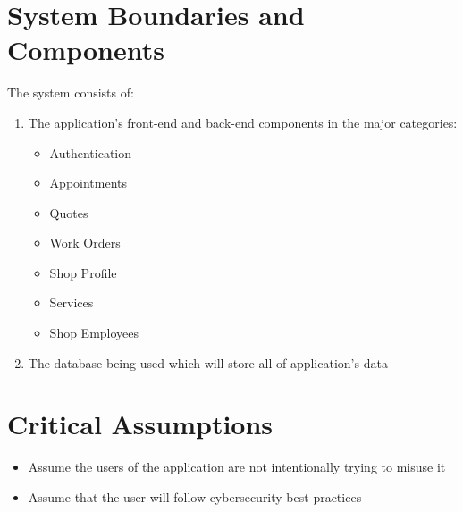 \documentclass{article}
\begin{document}
\section{System Boundaries and Components}
The system consists of:
\begin{enumerate}
	\item The application's front-end and back-end components in the major categories:
	      \begin{itemize}
		      \item Authentication
		      \item Appointments
		      \item Quotes
		      \item Work Orders
		      \item Shop Profile
		      \item Services
		      \item Shop Employees
	      \end{itemize}
	\item The database being used which will store all of application's data
\end{enumerate}

\section{Critical Assumptions}
\begin{itemize}
	\item Assume the users of the application are not intentionally trying to misuse it
	\item Assume that the user will follow cybersecurity best practices
\end{itemize}
\end{document}
